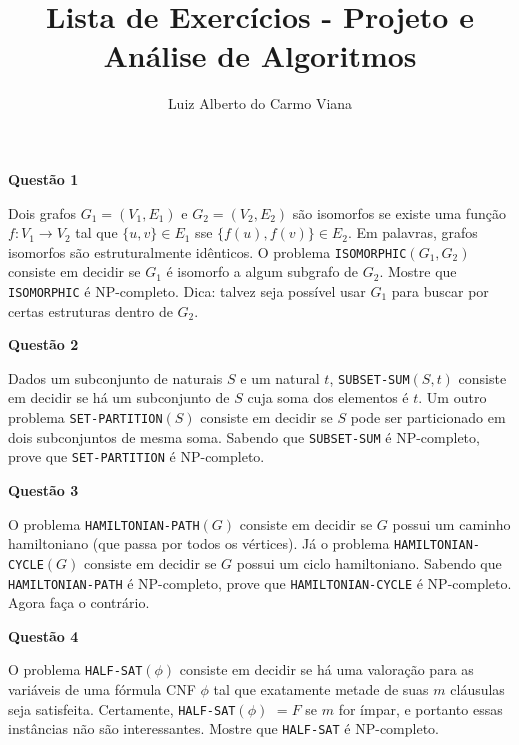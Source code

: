 \documentclass[]{article}
\title{Lista de Exercícios - Projeto e Análise de Algoritmos}
\author{Luiz Alberto do Carmo Viana}
\begin{document}
\maketitle

\vspace{\baselineskip}

\textbf{Questão 1}

Dois grafos $G_1 = (V_1, E_1)$ e $G_2 = (V_2, E_2)$ são isomorfos se
existe uma função $f : V_1 \to V_2$ tal que $\{u, v\} \in E_1$ sse
$\{f(u), f(v)\} \in E_2$.  Em palavras, grafos isomorfos são
estruturalmente idênticos.  O problema \texttt{ISOMORPHIC}$(G_1, G_2)$
consiste em decidir se $G_1$ é isomorfo a algum subgrafo de $G_2$.
Mostre que \texttt{ISOMORPHIC} é NP-completo.  Dica: talvez seja
possível usar $G_1$ para buscar por certas estruturas dentro de $G_2$.

\vspace{\baselineskip}

\textbf{Questão 2}

Dados um subconjunto de naturais $S$ e um natural $t$,
\texttt{SUBSET-SUM}$(S, t)$ consiste em decidir se há um subconjunto
de $S$ cuja soma dos elementos é $t$.  Um outro problema
\texttt{SET-PARTITION}$(S)$ consiste em decidir se $S$ pode ser
particionado em dois subconjuntos de mesma soma.  Sabendo que
\texttt{SUBSET-SUM} é NP-completo, prove que \texttt{SET-PARTITION} é
NP-completo.

\vspace{\baselineskip}

\textbf{Questão 3}

O problema \texttt{HAMILTONIAN-PATH}$(G)$ consiste em decidir se $G$
possui um caminho hamiltoniano (que passa por todos os vértices).  Já
o problema \texttt{HAMILTONIAN-CYCLE}$(G)$ consiste em decidir se $G$
possui um ciclo hamiltoniano.  Sabendo que \texttt{HAMILTONIAN-PATH} é
NP-completo, prove que \texttt{HAMILTONIAN-CYCLE} é NP-completo.
Agora faça o contrário.

\vspace{\baselineskip}

\textbf{Questão 4}

O problema \texttt{HALF-SAT}$(\phi)$ consiste em decidir se há uma
valoração para as variáveis de uma fórmula CNF $\phi$ tal que
exatamente metade de suas $m$ cláusulas seja satisfeita.  Certamente,
\texttt{HALF-SAT}$(\phi)$ $= F$ se $m$ for ímpar, e portanto essas
instâncias não são interessantes.  Mostre que \texttt{HALF-SAT} é
NP-completo.
\end{document}
